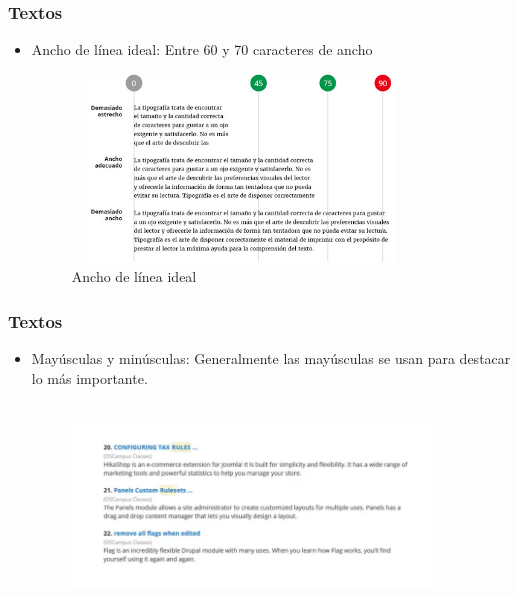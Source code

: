 \documentclass[11pt]{beamer}
\begin{document}
    \begin{frame}
    \frametitle{Textos} 
    \begin{itemize}
        \item Ancho de línea ideal: Entre 60 y 70 caracteres de ancho
        \begin{figure}
        \centering
        \includegraphics[width=9cm, height=5cm]{ancho-linea.jpg}
        \caption{Ancho de línea ideal}
        \label{fig:my_label}
    \end{figure}
    \end{itemize}
    \end{frame}
    
    \begin{frame}
    \frametitle{Textos} 
    \begin{itemize}
        \item Mayúsculas y minúsculas: Generalmente las mayúsculas se usan para destacar lo más importante.
        \begin{figure}
        \centering
        \includegraphics[width=9.5cm, height=5.5cm]{mayus-minus.png}
        \label{fig:my_label}
    \end{figure}
    \end{itemize}
    \end{frame}
    
    
    
    
    
\end{document}
